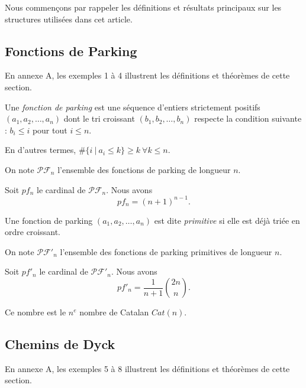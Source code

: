Nous commençons par rappeler les définitions et résultats principaux sur
les structures utilisées dans cet article.

\subsection{Fonctions de Parking}

En annexe A, les exemples 1 à 4 illustrent les définitions et théorèmes
de cette section.

\begin{definition}
    Une \emph{fonction de parking} est une séquence d'entiers strictement
    positifs $(a_1, a_2, \ldots, a_n)$ dont le tri croissant
    $(b_1, b_2, \ldots, b_n)$ respecte la condition suivante :
    $b_i \leqslant i$ pour tout $i \leqslant n$.
\end{definition}

En d'autres termes, $\#\{i\ |\ a_i \leqslant k\} \geqslant k\ 
\forall k \leqslant n$.

On note $\mathcal{PF}_n$ l'ensemble des fonctions de parking de longueur $n$.

\begin{theorem}
    Soit $pf_n$ le cardinal de $\mathcal{PF}_n$.
    Nous avons $$pf_n = (n + 1)^{n-1}.$$
\end{theorem}

\begin{definition}
    Une fonction de parking $(a_1, a_2, \ldots, a_n)$ est dite
    \emph{primitive} si elle est déjà triée en ordre croissant.    
\end{definition}

On note $\mathcal{PF'}_n$ l'ensemble des fonctions de parking primitives
de longueur $n$.

\begin{theorem}[Stanley, 1999]
    Soit $pf'_n$ le cardinal de $\mathcal{PF'}_n$.
    Nous avons $$pf'_n = \frac{1}{n + 1} \binom{2n}{n}.$$
\end{theorem}

Ce nombre est le $n^{e}$ nombre de Catalan $Cat(n)$.

\subsection{Chemins de Dyck}

En annexe A, les exemples 5 à 8 illustrent les définitions et théorèmes
de cette section.


